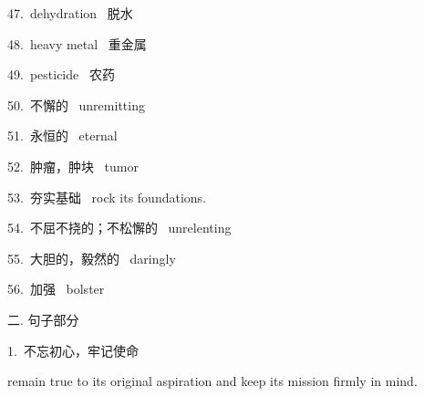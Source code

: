 \documentclass[a4paper, 12pt]{article}
\begin{document}
\begin{multicols}{2}
\begin{flushleft}
47.\ dehydration \ 脱水
\end{flushleft}

\begin{flushleft}
48.\ heavy metal \ 重金属
\end{flushleft}
\end{multicols}

\begin{multicols}{2}
\begin{flushleft}
49.\ pesticide \ 农药
\end{flushleft}

\begin{flushleft}
50.\ 不懈的 \ unremitting
\end{flushleft}
\end{multicols}

\begin{multicols}{2}
\begin{flushleft}
51.\ 永恒的 \ eternal 
\end{flushleft}

\begin{flushleft}
52.\ 肿瘤，肿块 \ tumor
\end{flushleft}
\end{multicols}

\begin{multicols}{2}
\begin{flushleft}
53.\ 夯实基础 \ rock its foundations.
\end{flushleft}

\begin{flushleft}
54.\ 不屈不挠的；不松懈的 \ unrelenting 
\end{flushleft}
\end{multicols}

\begin{multicols}{2}
\begin{flushleft}
55.\ 大胆的，毅然的 \ daringly 
\end{flushleft}

\begin{flushleft}
56.\ 加强 \ bolster 
\end{flushleft}
\end{multicols}

\begin{flushleft}
二. 句子部分
\end{flushleft}

\begin{flushleft}
1.\ 不忘初心，牢记使命

remain true to its original aspiration and keep its mission firmly in mind.
\end{flushleft}
\end{document}
